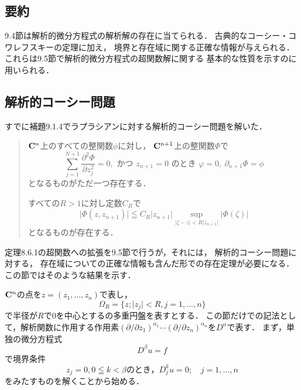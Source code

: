 \subsection*{要約}
9.4節は解析的微分方程式の解析解の存在に当てられる．
古典的なコーシー・コワレフスキーの定理に加え，
境界と存在域に関する正確な情報が与えられる．
これらは9.5節で解析的微分方程式の超関数解に関する
基本的な性質を示すのに用いられる．

\subsection{解析的コーシー問題}
すでに補題9.1.4でラプラシアンに対する解析的コーシー問題を解いた．
\begin{quotation}
    \begin{LMM}
        \(\mathbf{C}^n\)上のすべての整関数\(\phi\)に対し，
        \(\mathbf{C}^{n+1}\)上の整関数\(\varPhi\)で
        \begin{equation}
            \sum_{j=1}^{N+1}
            \frac{\partial^2\varPhi}{\partial z_{j}^2}=0,
            \text{ かつ }
            z_{n+1}=0 \text{ のとき } 
            \varphi=0,~ \partial_{n+1}\varPhi=\phi
        \end{equation}
        となるものがただ一つ存在する．
    
        すべての\(R>1\)に対し定数\(C_R\)で
        \begin{equation}
            \lvert\varPhi(z,z_{n+1})\rvert
            \leqq
            C_R\lvert z_{n+1}\rvert
            \sup_{\lvert \zeta-z\rvert< R\lvert z_{n+1}\rvert}
            \lvert\varPhi(\zeta)\rvert
        \end{equation}
        となるものが存在する．
    \end{LMM}    
\end{quotation}
定理8.6.1の超関数への拡張を9.5節で行うが，それには，
解析的コーシー問題に対する，
存在域についての正確な情報も含んだ形での存在定理が必要になる．
この節ではそのような結果を示す．

$\mathbf{C}^n$の点を\(z=(z_1,\dots,z_n)\)で表し，
\[
    \Omega_R=\{z;\lvert z_j\rvert<R,j=1,\dots,n\}
\]
で半径が\(R\)で\(0\)を中心とするの多重円盤を表すとする．
この節だけでの記法として，解析関数に作用する作用素\(
    (\partial/\partial z_1)^{\alpha_1}
    \cdots(\partial/\partial z_n)^{\alpha_n}
\)を\(D^\alpha\)で表す．
まず，単独の微分方程式
\begin{equation}
    D^\beta u=f\label{eq:single}
\end{equation}
で境界条件
\begin{equation}\label{cond:single}
    z_j=0, 0\leqq k<\beta\text{のとき，}D_j^ku=0;\quad j=1,\dots,n
\end{equation}
をみたすものを解くことから始める．

